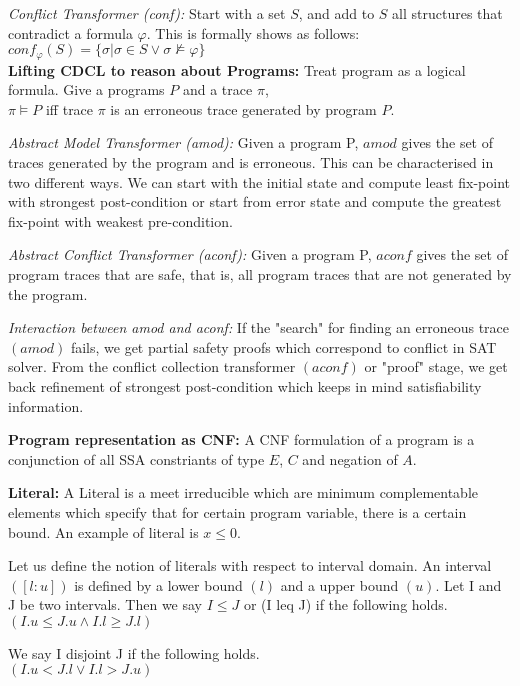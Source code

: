 \documentclass{article}
\begin{document}
\textit{Conflict Transformer (conf):} Start with a set $S$, and add to $S$ all structures 
that contradict a formula $\varphi$. This is formally shows as follows:\\
$conf_{\varphi}(S) = \{\sigma | \sigma \in S \vee \sigma \not\models \varphi\}$
\\
 
\textbf{Lifting CDCL to reason about Programs:}
Treat program as a logical formula. Give a programs $P$ and a trace $\pi$, \\
$\pi \models P$ iff trace $\pi$ is an erroneous trace generated by program
$P$.

\textit{Abstract Model Transformer (amod):} Given a program P, $amod$ gives the 
set of traces generated by the program and is erroneous. This can be
characterised in two different ways. We can start with the initial state and
compute least fix-point with strongest post-condition or start from error state 
and compute the greatest fix-point with weakest pre-condition. 

\textit{Abstract Conflict Transformer (aconf):} Given a program P, $aconf$ gives the 
set of program traces that are safe, that is, all program traces that are not
generated by the program. 

\textit{Interaction between amod and aconf:} If the "search" for finding an 
erroneous trace $(amod)$ fails, we get partial safety proofs which correspond 
to conflict in SAT solver. From the conflict collection transformer $(aconf)$ or 
"proof" stage, we get back refinement of strongest post-condition which keeps in 
mind satisfiability information. 

\textbf{Program representation as CNF:}
A CNF formulation of a program is a conjunction of all 
SSA constriants of type $E$, $C$ and negation of $A$.

\textbf{Literal:} A Literal is a meet irreducible which are minimum complementable
elements which specify that for certain program variable, there is a certain
bound. An example of literal is $x \leq 0$.

Let us define the notion of literals with respect to interval domain. 
An interval $([l:u])$ is defined by a lower bound $(l)$ and a upper bound $(u)$.
Let I and J be two intervals. Then we say $I \leq J$ or (I leq J) if the following
holds. \\
$(I.u \leq J.u \wedge I.l \geq J.l)$

We say I disjoint J if the following holds.\\
$(I.u < J.l \vee  I.l > J.u)$
\end{document}
